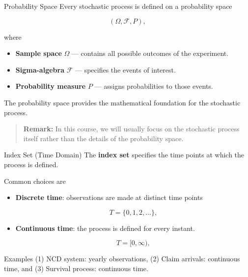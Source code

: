 \documentclass[
  ignorenonframetext,
  aspectratio=169,
]{beamer}
\providecommand{\tightlist}{%
  \setlength{\itemsep}{0pt}\setlength{\parskip}{0pt}}
\begin{document}
\begin{frame}{Probability Space}
\protect{}\label{probability-space}
Every stochastic process is defined on a probability space

\[
(\Omega,\mathcal{F},P),
\]

where

\begin{itemize}
\tightlist
\item
  \textbf{Sample space} \(\Omega\) --- contains all possible outcomes of
  the experiment.
\item
  \textbf{Sigma-algebra} \(\mathcal{F}\) --- specifies the events of
  interest.
\item
  \textbf{Probability measure} \(P\) --- assigns probabilities to those
  events.
\end{itemize}

The probability space provides the mathematical foundation for the
stochastic process.

\begin{quote}
\textbf{Remark:} In this course, we will usually focus on the stochastic
process itself rather than the details of the probability space.
\end{quote}
\end{frame}

\begin{frame}{Index Set (Time Domain)}
\protect{}\label{index-set-time-domain}
The \textbf{index set} specifies the time points at which the process is
defined.

Common choices are

\begin{itemize}
\item
  \textbf{Discrete time}: observations are made at distinct time points

  \[
  T=\{0,1,2,\ldots\},
  \]
\item
  \textbf{Continuous time}: the process is defined for every instant.

  \[
  T=[0,\infty),
  \]
\end{itemize}

Examples (1) NCD system: yearly observations, (2) Claim arrivals:
continuous time, and (3) Survival process: continuous time.
\end{frame}
\end{document}
